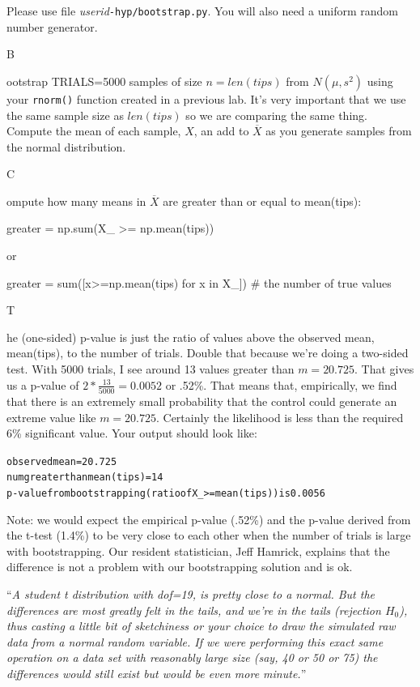 \documentclass[titlepage]{tufte-book}
\newcounter{problem}
\newcommand{\step}[1]{{}
\vspace{4pt} \noindent {\bf \theproblem. }#1\addtocounter{problem}{1}}
\begin{document}
\begin{fullwidth}
\item Please use file {\em userid}{\tt -hyp/bootstrap.py}. You will also need a uniform random number generator. 

\step Bootstrap TRIALS=5000 samples of size $n=len(tips)$ from $N(\mu, s^2)$ using your {\tt rnorm()} function created in a previous lab. It's very important that we use the same sample size as $len(tips)$ so we are comparing the same thing. Compute the mean of each sample, $X$, an add to $\overline{X}$ as you generate samples from the normal distribution.

\step Compute how many means in $\overline{X}$ are greater than or equal to mean(tips):

\begin{pyverbatim}
greater = np.sum(X_ >= np.mean(tips))
\end{pyverbatim}

or

\begin{pyverbatim}
greater = sum([x>=np.mean(tips) for x in X_]) # the number of true values
\end{pyverbatim}

\step The (one-sided) p-value is just the ratio of values above the observed mean, mean(tips), to the number of trials. Double that because we're doing a two-sided test. With 5000 trials, I see around 13 values greater than $m=20.725$. That gives us a p-value of $2*\frac{13}{5000} = 0.0052$ or .52\%. That means that, empirically, we find that there is an extremely small probability that the control could generate an extreme value like $m=20.725$. Certainly the likelihood is less than the required 6\% significant value.  Your output should look like:

\begin{alltt}
observed mean = 20.725
num greater than mean(tips) = 14
p-value from bootstrapping (ratio of X_ >= mean(tips)) is 0.0056
\end{alltt}

Note: we would expect the empirical p-value (.52\%) and the p-value derived from the t-test (1.4\%) to be very close to each other when the number of trials is large with bootstrapping.  Our resident statistician, Jeff Hamrick, explains that the difference is not a problem with our bootstrapping solution and is ok.

``{\em A student t distribution with dof=19, is pretty close to a normal. But the differences are most greatly felt in the tails, and we're in the tails (rejection $H_{0}$), thus casting a little bit of sketchiness or your choice to draw the simulated raw data from a normal random variable. If we were performing this exact same operation on a data set with reasonably large size (say, 40 or 50 or 75) the differences would still exist but would be even more minute.}''


\end{fullwidth}
\end{document}
